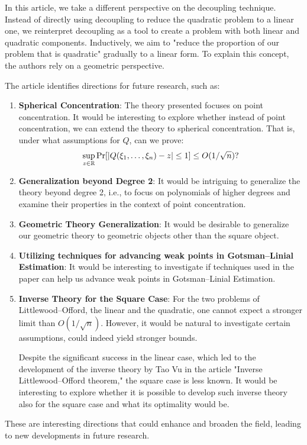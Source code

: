 In this article, we take a different perspective on the decoupling technique. Instead of directly using decoupling to reduce the quadratic problem to a linear one, we reinterpret decoupling as a tool to create a problem with both linear and quadratic components. Inductively, we aim to "reduce the proportion of our problem that is quadratic" gradually to a linear form. To explain this concept, the authors rely on a geometric perspective.
  
\vspace{\baselineskip}
The article identifies directions for future research, such as:
 
\begin{enumerate}
	\item \textbf{Spherical Concentration}: The theory presented focuses on point concentration. It would be interesting to explore whether instead of point concentration, we can extend the theory to spherical concentration. That is, under what assumptions for $Q$, can we prove:
	\vspace{-0.3\baselineskip}
	\[ \sup_{z\in\mathbb{R}} \Pr[|Q(\xi_1,\ldots,\xi_n) - z| \leq 1] \leq O(1/\sqrt{n})? \vspace{-0.4\baselineskip} \]
	
	\item \textbf{Generalization beyond Degree 2}: It would be intriguing to generalize the theory beyond degree 2, i.e., to focus on polynomials of higher degrees and examine their properties in the context of point concentration.
	
	\item \textbf{Geometric Theory Generalization}: It would be desirable to generalize our geometric theory to geometric objects other than the square object.
	
	\item \textbf{Utilizing techniques for advancing weak points in Gotsman–Linial Estimation}: It would be interesting to investigate if techniques used in the paper can help us advance weak points in Gotsman–Linial Estimation.

	\item \textbf{Inverse Theory for the Square Case}: For the two problems of Littlewood–Offord, the linear and the quadratic, one cannot expect a stronger limit than $O(1/\sqrt{n})$. However, it would be natural to investigate certain assumptions, could indeed yield stronger bounds.
	
	Despite the significant success in the linear case, which led to the development of the inverse theory by Tao Vu in the article "Inverse Littlewood–Offord theorem," the square case is less known. It would be interesting to explore whether it is possible to develop such inverse theory also for the square case and what its optimality would be.
\end{enumerate}
 
These are interesting directions that could enhance and broaden the field, leading to new developments in future research.

